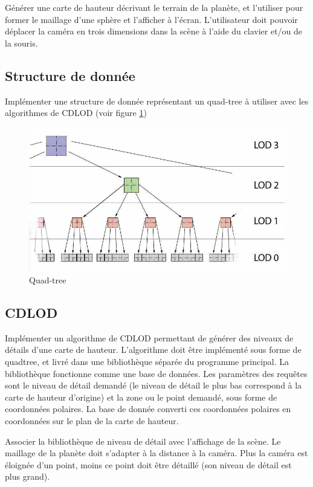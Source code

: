 \documentclass[12pt]{report}
\begin{document}
Générer une carte de hauteur décrivant le terrain de la planète, et l'utiliser pour former le maillage d'une sphère et l'afficher à l'écran. L'utilisateur doit pouvoir déplacer la caméra en trois dimensions dans la scène à l'aide du clavier et/ou de la souris.

\subsection{Structure de donnée}

Implémenter une structure de donnée représentant un quad-tree à utiliser avec les algorithmes de CDLOD (voir figure \ref{fig:quadtree})

\begin{figure}[h!]
  \includegraphics[scale=0.5]{img/Quadtree.png}
  \caption{Quad-tree}
  \label{fig:quadtree}
\end{figure}

\subsection{CDLOD}

Implémenter un algorithme de CDLOD permettant de générer des niveaux de détails d'une carte de hauteur. L'algorithme doit être implémenté sous forme de quadtree, et livré dans une bibliothèque séparée du programme principal. La bibliothèque fonctionne comme une base de données. Les paramètres des requêtes sont le niveau de détail demandé (le niveau de détail le plus bas correspond à la carte de hauteur d'origine) et la zone ou le point demandé, sous forme de coordonnées polaires. La base de donnée converti ces coordonnées polaires en coordonnées sur le plan de la carte de hauteur.

Associer la bibliothèque de niveau de détail avec l'affichage de la scène. Le maillage de la planète doit s'adapter à la distance à la caméra. Plus la caméra est éloignée d'un point, moins ce point doit être détaillé (son niveau de détail est plus grand).
\end{document}
